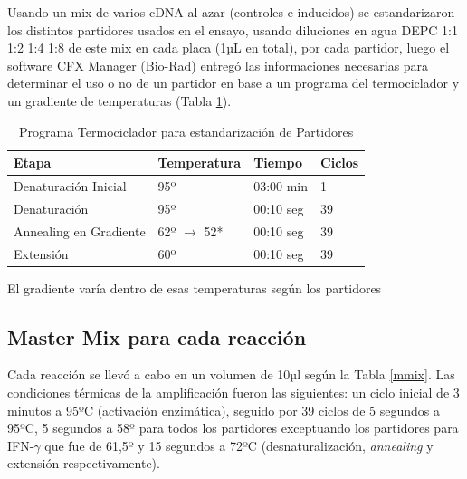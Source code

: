 \documentclass[12pt,letterpaper,oneside]{scrbook}
\begin{document}
Usando un mix de varios cDNA al azar (controles e inducidos) se
estandarizaron los distintos partidores usados en el ensayo, usando
diluciones en agua DEPC 1:1 1:2 1:4 1:8 de este mix en cada placa (1µL
en total), por cada partidor, luego el software CFX Manager (Bio-Rad)
entregó las informaciones necesarias para determinar el uso o no de un
partidor en base a un programa del termociclador y un gradiente de
temperaturas (Tabla \ref{tabla:estandar}).

\begin{table}[h!]
    \begin{center}
        \begin{threeparttable}
            \caption{Programa Termociclador para estandarización de Partidores}\label{tabla:estandar}
            \begin{tabularx}{13cm}{l X l l}
                \toprule
                Etapa & Temperatura & Tiempo & Ciclos \\
                \midrule
                Denaturación Inicial & 95º & 03:00 min & 1 \\
                Denaturación & 95º & 00:10 seg & 39\\
                Annealing en Gradiente & 62º $\rightarrow$ 52* & 00:10 seg & 39 \\
                Extensión & 60º & 00:10 seg & 39 \\
                \bottomrule
            \end{tabularx}
            \begin{tablenotes}
                \item El gradiente varía dentro de esas temperaturas según los partidores
            \end{tablenotes}
        \end{threeparttable}
    \end{center}
\end{table}

\subsection{Master Mix para cada reacción}

Cada reacción se llevó a cabo en un volumen de 10µl según la Tabla
\ref{mmix}. Las condiciones térmicas de la amplificación fueron las
siguientes: un ciclo inicial de 3 minutos a 95ºC (activación
enzimática), seguido por 39 ciclos de 5 segundos a 95ºC, 5 segundos a
58º para todos los partidores exceptuando los partidores para
IFN-\(\gamma\) que fue de 61,5º y 15 segundos a 72ºC (desnaturalización,
\emph{annealing} y extensión respectivamente).
\end{document}
